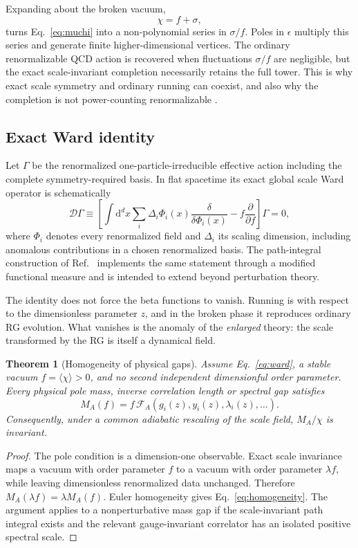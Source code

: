 \documentclass[11pt,a4paper]{article}
\newtheorem{theorem}[definition]{Theorem}
\newcommand{\dd}{\mathrm{d}}
\begin{document}
Expanding about the broken vacuum,
\[
\chi=f+\sigma,
\]
turns Eq.~\eqref{eq:muchi} into a non-polynomial series in $\sigma/f$. Poles in $\epsilon$ multiply this series and generate finite higher-dimensional vertices. The ordinary renormalizable QCD action is recovered when fluctuations $\sigma/f$ are negligible, but the exact scale-invariant completion necessarily retains the full tower. This is why exact scale symmetry and ordinary running can coexist, and also why the completion is not power-counting renormalizable \cite{Tamarit2013,Ghilencea2016,HerreroValea2020}.

\subsection{Exact Ward identity}

Let $\Gamma$ be the renormalized one-particle-irreducible effective action including the complete symmetry-required basis. In flat spacetime its exact global scale Ward operator is schematically
\[
\mathcal D\Gamma
\equiv
\left[
\int\dd^dx\sum_i\Delta_i\Phi_i(x)
\frac{\delta}{\delta\Phi_i(x)}
-f\frac{\partial}{\partial f}
\right]\Gamma=0,
\label{eq:ward}
\]
where $\Phi_i$ denotes every renormalized field and $\Delta_i$ its scaling dimension, including anomalous contributions in a chosen renormalized basis. The path-integral construction of Ref.~\cite{HerreroValea2020} implements the same statement through a modified functional measure and is intended to extend beyond perturbation theory.

The identity does not force the beta functions to vanish. Running is with respect to the dimensionless parameter $z$, and in the broken phase it reproduces ordinary RG evolution. What vanishes is the anomaly of the \emph{enlarged} theory: the scale transformed by the RG is itself a dynamical field.

\begin{theorem}[Homogeneity of physical gaps]
Assume Eq.~\eqref{eq:ward}, a stable vacuum $f=\langle\chi\rangle>0$, and no second independent dimensionful order parameter. Every physical pole mass, inverse correlation length or spectral gap satisfies
\[
\boxed{
M_A(f)=f\,\mathcal F_A(g_i(z),y_i(z),\lambda_i(z),\ldots).
}
\label{eq:homogeneity}
\]
Consequently, under a common adiabatic rescaling of the scale field, $M_A/\chi$ is invariant.
\end{theorem}

\begin{proof}
The pole condition is a dimension-one observable. Exact scale invariance maps a vacuum with order parameter $f$ to a vacuum with order parameter $\lambda f$, while leaving dimensionless renormalized data unchanged. Therefore $M_A(\lambda f)=\lambda M_A(f)$. Euler homogeneity gives Eq.~\eqref{eq:homogeneity}. The argument applies to a nonperturbative mass gap if the scale-invariant path integral exists and the relevant gauge-invariant correlator has an isolated positive spectral scale.
\end{proof}
\end{document}
